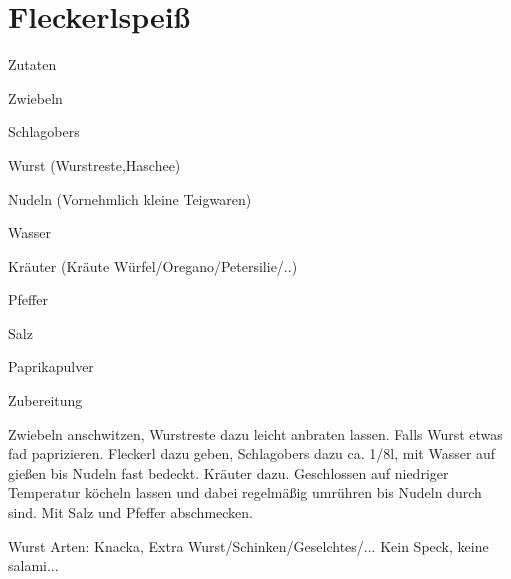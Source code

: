 \chapter*{Fleckerlspeiß}
\begin{multicols}{2}
 {\Large Zutaten}
 \begin{Zutaten}
		\item Zwiebeln
		\item Schlagobers
		\item Wurst (Wurstreste,Haschee)
		\item Nudeln (Vornehmlich kleine Teigwaren)
		\item Wasser
		\item Kräuter (Kräute Würfel/Oregano/Petersilie/..)
		\item Pfeffer
		\item Salz
		\item Paprikapulver
		
		
\end{Zutaten}
	
\columnbreak
{}
\end{multicols}

{\Large Zubereitung} \newline
\begin{addmargin}[1cm]{0cm}
	Zwiebeln anschwitzen, Wurstreste dazu leicht anbraten lassen.\newline
	Falls Wurst etwas fad paprizieren.\newline
	Fleckerl dazu geben, Schlagobers dazu ca. 1/8l, mit Wasser auf gießen bis Nudeln fast bedeckt.\newline
	Kräuter dazu.\newline
	Geschlossen auf niedriger Temperatur köcheln lassen und dabei regelmäßig umrühren bis Nudeln durch
	sind.\newline
	Mit Salz und Pfeffer abschmecken.\newline\newline
	
	Wurst Arten: Knacka, Extra Wurst/Schinken/Geselchtes/...\newline
	Kein Speck, keine salami...
	
	
	
	
\end{addmargin}
